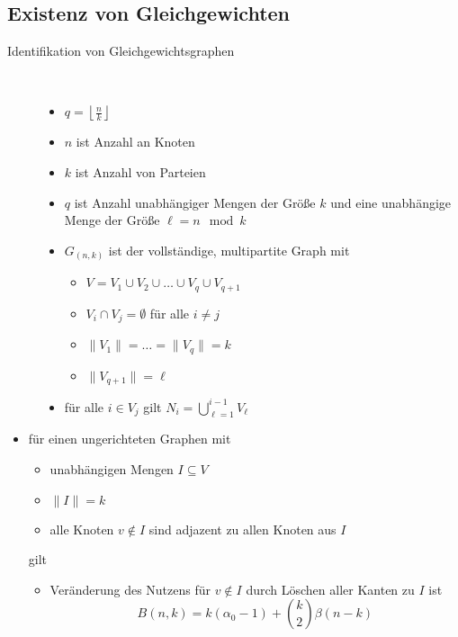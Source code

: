 \subsection{Existenz von Gleichgewichten}
	\begin{description}
		\item[Identifikation von Gleichgewichtsgraphen] \ \\\vspace*{-\baselineskip}
			\begin{itemize}
				\item $q=\left\lfloor\frac{n}{k}\right\rfloor$
				\item $n$ ist Anzahl an Knoten
				\item $k$ ist Anzahl von Parteien
				\item $q$ ist Anzahl unabhängiger Mengen der Größe $k$ und eine unabhängige Menge der Größe \mbox{$\ell = n \mod k$}
				\item $G_(n,k)$ ist der vollständige, multipartite Graph mit
					\begin{itemize}
						\item $V= V_1 \cup V_2 \cup \dots \cup V_q \cup V_{q+1}$
						\item $V_i \cap V_j = \emptyset$ für alle $i\neq j$
						\item $\| V_1\|= \dots =\|V_q\|=k$
						\item $\|V_{q+1}\|=\ell$
					\end{itemize}
				\item für alle $i\in V_j$ gilt $N_i=\bigcup\limits_{\ell=1}^{i-1}V_\ell$
			\end{itemize}
	\end{description}
	\begin{itemize}
		\item für einen ungerichteten Graphen mit
			\begin{itemize}
				\item unabhängigen Mengen $I\subseteq V$
				\item $\|I\|=k$
				\item alle Knoten $v\notin I$ sind adjazent zu allen Knoten aus $I$
			\end{itemize}
			gilt
			\begin{itemize}
				\item Veränderung des Nutzens für $v\notin I$ durch Löschen aller Kanten zu $I$ ist
					\[B(n,k)=k(\alpha_0-1)+{k \choose 2}\beta(n-k)\]
			\end{itemize}
	\end{itemize}

